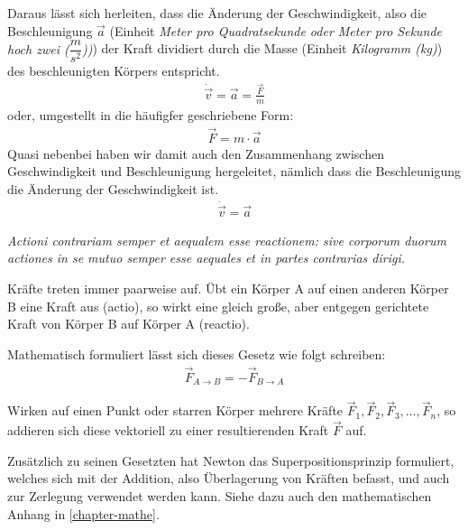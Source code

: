 Daraus lässt sich herleiten, dass die Änderung der Geschwindigkeit, also die Beschleunigung $\vec{a}$ (Einheit \textit{Meter pro Quadratsekunde oder Meter pro Sekunde hoch zwei ($\dfrac{m}{s^2}$))}) der Kraft dividiert durch die Masse (Einheit \textit{Kilogramm (kg)}) des beschleunigten Körpers entspricht.
\begin{eqnarray}
\dot{\vec{v}}=\vec{a}=\frac{\vec{F}}{m}
\end{eqnarray}
oder, umgestellt in die häufigfer geschriebene Form:
\begin{eqnarray}
\vec{F}=m \cdot \vec{a}
\end{eqnarray}
Quasi nebenbei haben wir damit auch den Zusammenhang zwischen Geschwindigkeit und Beschleunigung hergeleitet, nämlich dass die Beschleunigung die Änderung der Geschwindigkeit ist.
\begin{eqnarray}
\dot{\vec{v}}=\vec{a}
\end{eqnarray}

\begin{mdframed}[backgroundcolor=SRH_Warm_Grey!50,skipabove=3em,skipbelow=1em,frametitle=Newtons drittes Gesetz (Gegenwirkungsprinzip)]
\textit{Actioni contrariam semper et aequalem esse reactionem: sive corporum duorum actiones in se mutuo semper esse aequales et in partes contrarias dirigi.}

Kräfte treten immer paarweise auf. Übt ein Körper A auf einen anderen Körper B eine Kraft aus (actio), so wirkt eine gleich große, aber entgegen gerichtete Kraft von Körper B auf Körper A (reactio).
\end{mdframed}
Mathematisch formuliert lässt sich dieses Gesetz wie folgt schreiben:
\begin{eqnarray}
\vec{F}_{A\rightarrow B}=-\vec{F}_{B\rightarrow A}
\end{eqnarray}


\begin{mdframed}[backgroundcolor=SRH_Warm_Grey!50,skipabove=3em,skipbelow=1em,frametitle=Superpositionsprinzip der Kräfte]
Wirken auf einen Punkt oder starren Körper mehrere Kräfte $\vec{F}_{1},\vec{F}_{2},\vec{F}_{3},\dotsc,\vec{F}_{n}$, so addieren sich diese vektoriell zu einer resultierenden Kraft $\vec{F}$ auf.
\end{mdframed}
Zusätzlich zu seinen Gesetzten hat Newton das Superpositionsprinzip formuliert, welches sich mit der Addition, also Überlagerung von Kräften befasst, und auch zur Zerlegung verwendet werden kann. Siehe dazu auch den mathematischen Anhang in \ref{chapter-mathe}.

